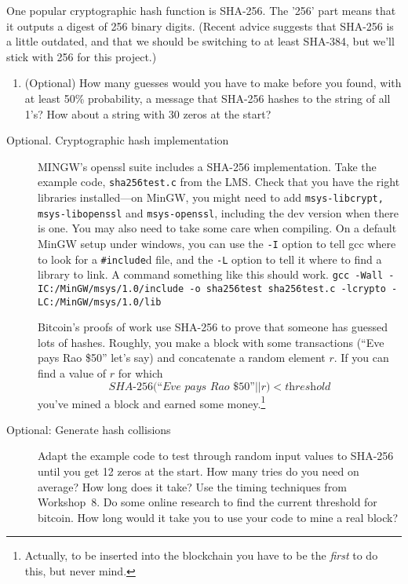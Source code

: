 \documentclass[11pt]{article}
\newcommand{\concat}{||}
\begin{document}
One popular cryptographic hash function is SHA-256.
The '256' part means that it outputs a digest of 256 binary digits.
(Recent advice suggests that SHA-256 is a little outdated,
and that we should be switching to at least SHA-384,
but we'll stick with 256 for this project.)

\begin{enumerate}[resume]
\item (Optional) How many guesses would you have to make before you found, with at least
    50\% probability, a message that SHA-256 hashes to the string of all 1's?
        How about a string with 30 zeros at the start?
\end{enumerate}

\begin{description}
\item[Optional.  Cryptographic hash implementation]
    MINGW's openssl suite includes a SHA-256 implementation.
        Take the example code,
        \texttt{sha256test.c} from the {LMS}.
        Check that you have the right libraries installed---on MinGW,
        you might need to add \texttt{msys-libcrypt, msys-libopenssl} and
        \texttt{msys-openssl},
        including the dev version when there is one.
        You may also need to take some care when compiling.
        On a default MinGW setup under windows,
        you can use the \texttt{-I} option to tell gcc where to look for a \texttt{\#include}d file,
        and the \texttt{-L} option to tell it where to find a library to link.
        A command something like this should work.
        \texttt{gcc -Wall -IC:/MinGW/msys/1.0/include -o sha256test sha256test.c -lcrypto -LC:/MinGW/msys/1.0/lib}

Bitcoin's proofs of work use SHA-256 to prove that someone has guessed lots of hashes.
        Roughly, you make a block with some transactions (``Eve pays Rao \$50'' let's say) and concatenate a random element $r$.
        If you can find a value of $r$ for which
        $$\textit{SHA-256(``Eve pays Rao \$50''} \concat r) < \textit{threshold}$$
        you've mined a block and earned some money.\footnote{
            Actually, to be inserted into the blockchain you have to be the \emph{first} to do this, but never mind.
        }

\item[Optional: Generate hash collisions]
    Adapt the example code to test through random input values to SHA-256 until you get 12 zeros at the start.
        How many tries do you need on average?
        How long does it take?
        Use the timing techniques from Workshop~8.
        Do some online research to find the current threshold for bitcoin.
        How long would it take you to use your code to mine a real block?


\end{description}
\end{document}
